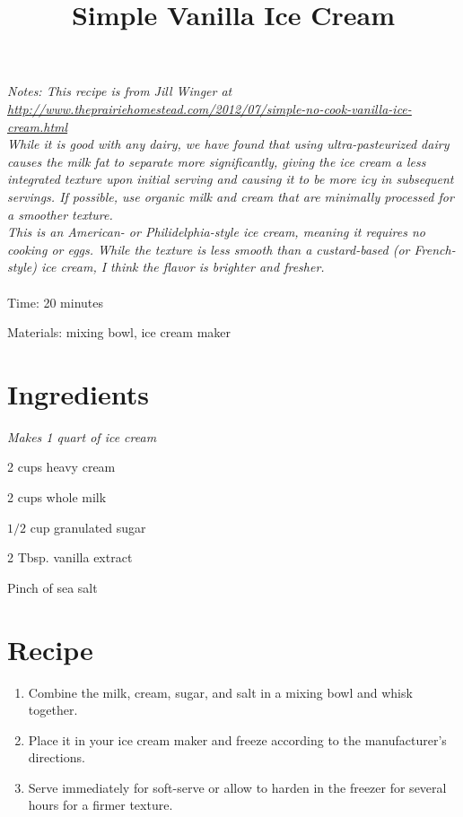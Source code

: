 \documentclass{article}
\title{Simple Vanilla Ice Cream}
\begin{document}
\maketitle
{\small
\textit{Notes: This recipe is from Jill Winger at \url{http://www.theprairiehomestead.com/2012/07/simple-no-cook-vanilla-ice-cream.html}
\\
While it is good with any dairy, we have found that using ultra-pasteurized dairy causes the milk fat to separate more significantly, giving the ice cream a less integrated texture upon initial serving and causing it to be more icy in subsequent servings. If possible, use organic milk and cream that are minimally processed for a smoother texture.
\\
This is an American- or Philidelphia-style ice cream, meaning it requires no cooking or eggs. While the texture is less smooth than a custard-based (or French-style) ice cream, I think the flavor is brighter and fresher.
}}
\\\\

Time: 20 minutes

Materials: mixing bowl, ice cream maker

\section{Ingredients}

\textit{Makes 1 quart of ice cream}

2 cups heavy cream

2 cups whole milk

$1/2$ cup granulated sugar

2 Tbsp. vanilla extract

Pinch of sea salt

\section{Recipe}
\begin{enumerate}
\item{Combine the milk, cream, sugar, and salt in a mixing bowl and whisk together.}
\item{Place it in your ice cream maker and freeze according to the manufacturer’s directions.}
\item{Serve immediately for soft-serve or allow to harden in the freezer for several hours for a firmer texture.}
\end{enumerate}
\end{document}
